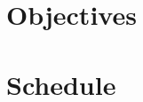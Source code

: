 \documentclass[headsepline,footsepline,footinclude=false,oneside,fontsize=11pt,paper=a4,listof=totoc,bibliography=totoc]{scrbook} %
\begin{document}
\section{Objectives}

\section{Schedule}


\printbibliography{}






\end{document}
